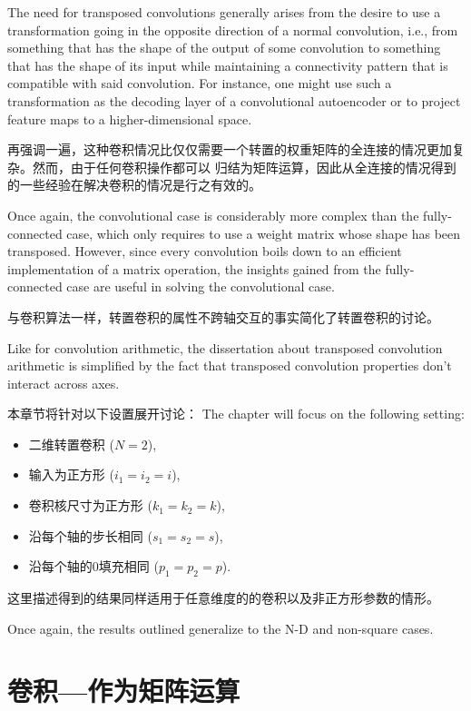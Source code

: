 \documentclass[notitlepage]{report}
\begin{document}
The need for transposed convolutions generally arises from the desire to use a
transformation going in the opposite direction of a normal convolution, i.e.,
from something that has the shape of the output of some convolution to
something that has the shape of its input while maintaining a connectivity
pattern that is compatible with said convolution. For instance, one might use
such a transformation as the decoding layer of a convolutional autoencoder or to
project feature maps to a higher-dimensional space.

再强调一遍，这种卷积情况比仅仅需要一个转置的权重矩阵的全连接的情况更加复杂。然而，由于任何卷积操作都可以
归结为矩阵运算，因此从全连接的情况得到的一些经验在解决卷积的情况是行之有效的。

Once again, the convolutional case is considerably more complex than the
fully-connected case, which only requires to use a weight matrix whose shape
has been transposed. However, since every convolution boils down to an
efficient implementation of a matrix operation, the insights gained from the
fully-connected case are useful in solving the convolutional case.

与卷积算法一样，转置卷积的属性不跨轴交互的事实简化了转置卷积的讨论。

Like for convolution arithmetic, the dissertation about transposed convolution
arithmetic is simplified by the fact that transposed convolution properties
don't interact across axes.

本章节将针对以下设置展开讨论：
The chapter will focus on the following setting:

\begin{itemize}
    \item 二维转置卷积 ($N = 2$),
    \item 输入为正方形 ($i_1 = i_2 = i$),
    \item 卷积核尺寸为正方形 ($k_1 = k_2 = k$),
    \item 沿每个轴的步长相同 ($s_1 = s_2 = s$),
    \item 沿每个轴的0填充相同 ($p_1 = p_2 = p$).
\end{itemize}

\noindent 这里描述得到的结果同样适用于任意维度的的卷积以及非正方形参数的情形。

\noindent Once again, the results outlined generalize to the N-D and non-square
cases.

\section{卷积---作为矩阵运算}
\end{document}
